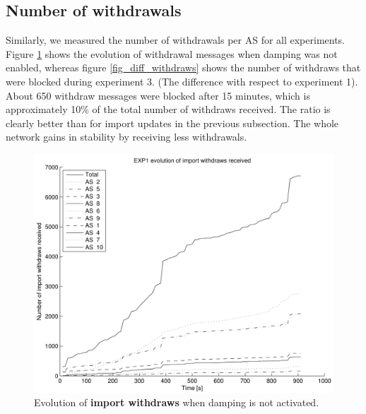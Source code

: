 \documentclass[a4paper,english]{IEEEtran}
\begin{document}
\subsection{Number of withdrawals}

Similarly, we measured the number of withdrawals per AS for all experiments. 
Figure \ref{fig_exp1_withdraws} shows the evolution of withdrawal messages when damping was not enabled, whereas figure \ref{fig_diff_withdraws}
shows the number of withdraws that were blocked during experiment 3. (The difference with respect to experiment 1).
About 650 withdraw messages were blocked after 15 minutes, which is approximately 10\% of the total number of withdraws received. The ratio is clearly 
better than for import updates in the previous subsection. The whole network gains in stability by receiving less withdrawals.

\begin{figure}
\begin{center}
\includegraphics[scale=.5]{img/exp1_withdraws.pdf}
\end{center}
\caption{Evolution of \textbf{import withdraws} when damping is not activated.}
\label{fig_exp1_withdraws}
\end{figure}
\end{document}
